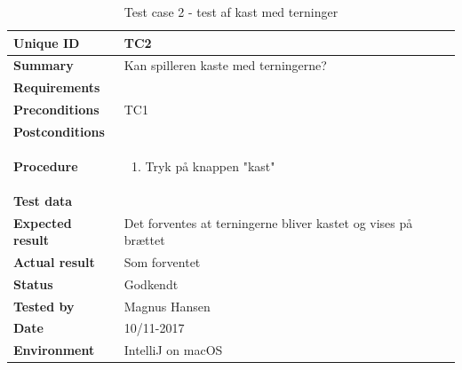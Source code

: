 \begin{table}[H]
    \begin{center}
        \begin{tabular}{|l|p{8cm}|}
            \hline
            \textbf{Unique ID} & TC2 \\
            \hline
            \textbf{Summary} & Kan spilleren kaste med terningerne? \\
            \hline
            \textbf{Requirements} & \\
            \hline
            \textbf{Preconditions} & TC1 \\
            \hline
            \textbf{Postconditions} & \\
            \hline
            \textbf{Procedure} & \begin{enumerate}
                \setlength\itemsep{0ex}
                \item Tryk på knappen "kast"
            \end{enumerate} \\
            \hline
            \textbf{Test data} & \\
            \hline
            \textbf{Expected result} & Det forventes at terningerne bliver kastet og vises på brættet \\
            \hline
            \textbf{Actual result} & Som forventet \\
            \hline
            \textbf{Status} & Godkendt \\
            \hline
            \textbf{Tested by} & Magnus Hansen \\
            \hline
            \textbf{Date} & 10/11-2017 \\
            \hline
            \textbf{Environment} & IntelliJ on macOS \\
            \hline
        \end{tabular}
    \end{center}
    \caption{Test case 2 - test af kast med terninger}
    \label{tc:2}
\end{table}

